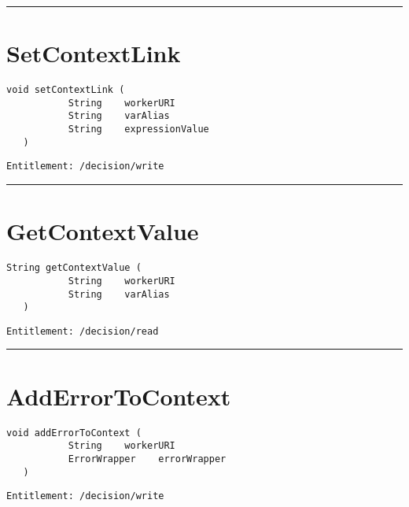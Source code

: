 \rule{12cm}{2pt}
\section{SetContextLink}
\label{Api:SetContextLink}
\begin{lstlisting}[style=nonumbers]
   void setContextLink (
           String    workerURI
           String    varAlias
           String    expressionValue
   )
\end{lstlisting}
\begin{Verbatim}[formatcom=\color{Maroon}]
  Entitlement: /decision/write
\end{Verbatim}



\rule{12cm}{2pt}
\section{GetContextValue}
\label{Api:GetContextValue}
\begin{lstlisting}[style=nonumbers]
   String getContextValue (
           String    workerURI
           String    varAlias
   )
\end{lstlisting}
\begin{Verbatim}[formatcom=\color{Maroon}]
  Entitlement: /decision/read
\end{Verbatim}



\rule{12cm}{2pt}
\section{AddErrorToContext}
\label{Api:AddErrorToContext}
\begin{lstlisting}[style=nonumbers]
   void addErrorToContext (
           String    workerURI
           ErrorWrapper    errorWrapper
   )
\end{lstlisting}
\begin{Verbatim}[formatcom=\color{Maroon}]
  Entitlement: /decision/write
\end{Verbatim}




